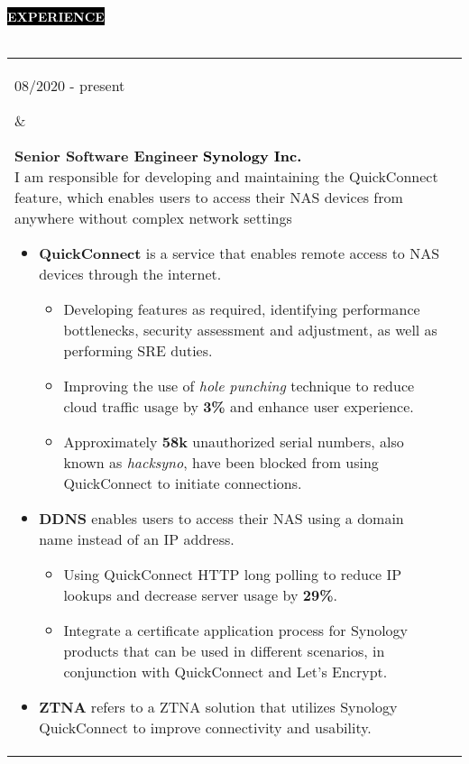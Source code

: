 \documentclass[10pt,A4]{article}
\makeatletter
\newcounter{a}
\newcounter{b}
\newcounter{c}
\newcommand{\cvsection}[1] {
	\textcolor{white}{\MakeUppercase{\textbf{#1}}}
}
\newcommand{\cvsect}[1]{
	\colorbox{black}{{\cvsection{#1}}}\\\\%
}
\newenvironment{entrylist}{%
	\begin{tabular*}{\textwidth}[t]{@{\extracolsep{\fill}}ll}
	}{%
	\end{tabular*}
}
\newcommand{\entry}[4]{%
	\parbox[t]{3.5cm}{%
		#1%
	}%
	&\parbox[t]{14cm}{%
		\textbf{#2}%
		\hfill%
		{\footnotesize \textbf{\textcolor{black}{#3}}}\\%
		#4%
	}\\\\}
\makeatother
\begin{document}
	\cvsect{Experience}\nobreak
	\begin{entrylist}
		\entry
		{08/2020 - present}
		{Senior Software Engineer}
		{Synology Inc.}
		{I am responsible for developing and maintaining the QuickConnect feature, which enables users to access their NAS devices from anywhere without complex network settings\\
				\begin{itemize}[leftmargin=*]
					\vspace{-0.5\baselineskip}
					\item \textbf{QuickConnect} \small is a service that enables remote access to NAS devices through the internet.\\
					\begin{itemize}\normalsize
						\vspace{-1\baselineskip}
						\item Developing features as required, identifying performance bottlenecks, security assessment and adjustment, as well as performing SRE duties.
						\item Improving the use of \textit{hole punching} technique to reduce cloud traffic usage by \textbf{3\%} and enhance user experience.
						\item Approximately \textbf{58k} unauthorized serial numbers, also known as \textit{hacksyno}, have been blocked from using QuickConnect to initiate connections.
					\end{itemize}
					\item \textbf{DDNS} \small enables users to access their NAS using a domain name instead of an IP address.\\
					\begin{itemize}\normalsize
						\vspace{-1\baselineskip}
						\item Using QuickConnect HTTP long polling to reduce IP lookups and decrease server usage by \textbf{29\%}.
						\item Integrate a certificate application process for Synology products that can be used in different scenarios, in conjunction with QuickConnect and Let's Encrypt.
					\end{itemize}
					\item \textbf{ZTNA} \small refers to a ZTNA solution that utilizes Synology QuickConnect to improve connectivity and usability.\\

\end{itemize}}
\end{entrylist}
\end{document}
